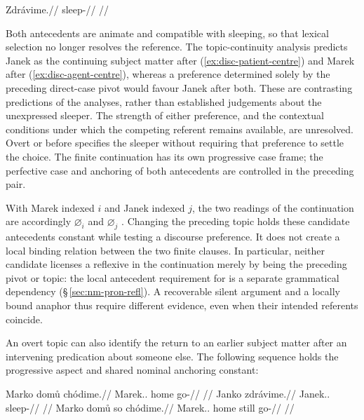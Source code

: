 \ex\label{ex:disc-ambiguous-continuation}
\begingl
\gla Zdrávime.//
\glb sleep-\Prog{}//
\glft {}//
\endgl
\xe

\noindent Both antecedents are animate and compatible with sleeping, so that
 lexical selection no longer resolves the reference. The topic-continuity
 analysis predicts Janek as the continuing subject matter after
 (\ref{ex:disc-patient-centre}) and Marek after
 (\ref{ex:disc-agent-centre}), whereas a preference determined solely by the
 preceding direct-case pivot would favour Janek after both. These are
 contrasting predictions of the analyses, rather than established judgements
 about the unexpressed sleeper. The strength of either preference, and the
 contextual conditions under which the competing referent remains available,
 are unresolved. Overt  or  before 
 specifies the sleeper without requiring that preference to settle the choice.
 The finite continuation has its own progressive case frame; the perfective
 case and anchoring of both antecedents are controlled in the preceding pair.

With Marek indexed $i$ and Janek indexed $j$, the two readings of the
continuation are accordingly $\varnothing_i$  and
$\varnothing_j$ . Changing the preceding topic holds these
candidate antecedents constant while testing a discourse preference. It does
not create a local binding relation between the two finite clauses. In
particular, neither candidate licenses a reflexive in the continuation merely
by being the preceding pivot or topic: the local antecedent requirement for
 is a separate grammatical dependency
(§\,\ref{sec:nm-pron-refl}). A recoverable silent argument and a locally
bound anaphor thus require different evidence, even when their intended
referents coincide.

An overt topic can also identify the return to an earlier subject matter
 after an intervening predication about someone else. The following sequence
 holds the progressive aspect and shared nominal anchoring constant:

\pex\label{ex:disc-reactivation}
\a
\begingl
\gla Marko domů chódime.//
\glb Marek.\Dir{}.\Def{} home go-\Prog{}//
\glft {} //
\endgl
\a
\begingl
\gla Janko zdrávime.//
\glb Janek.\Dir{}.\Def{} sleep-\Prog{}//
\glft {} //
\endgl
\a
\begingl
\gla Marko domů so chódime.//
\glb Marek.\Dir{}.\Def{} home still go-\Prog{}//
\glft {} //
\endgl
\xe

